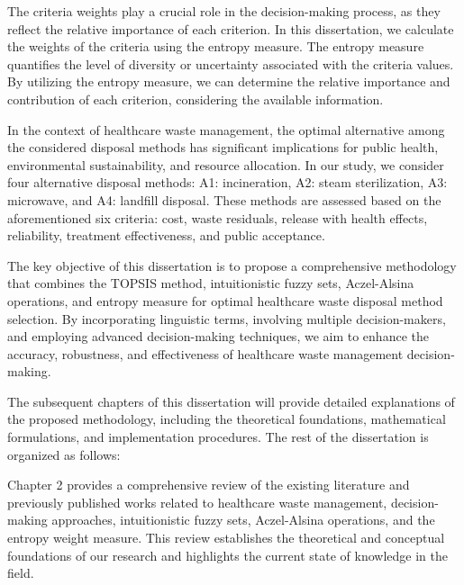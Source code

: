 \vspace{5mm}

The criteria weights play a crucial role in the decision-making process, as they reflect the relative importance of each criterion. In this dissertation, we calculate the weights of the criteria using the entropy measure. The entropy measure quantifies the level of diversity or uncertainty associated with the criteria values. By utilizing the entropy measure, we can determine the relative importance and contribution of each criterion, considering the available information.

\vspace{5mm}

In the context of healthcare waste management, the optimal alternative among the considered disposal methods has significant implications for public health, environmental sustainability, and resource allocation. In our study, we consider four alternative disposal methods: A1: incineration, A2: steam sterilization, A3: microwave, and A4: landfill disposal. These methods are assessed based on the aforementioned six criteria: cost, waste residuals, release with health effects, reliability, treatment effectiveness, and public acceptance.

\vspace{5mm}

The key objective of this dissertation is to propose a comprehensive methodology that combines the TOPSIS method, intuitionistic fuzzy sets, Aczel-Alsina operations, and entropy measure for optimal healthcare waste disposal method selection. By incorporating linguistic terms, involving multiple decision-makers, and employing advanced decision-making techniques, we aim to enhance the accuracy, robustness, and effectiveness of healthcare waste management decision-making.

\vspace{5mm}

The subsequent chapters of this dissertation will provide detailed explanations of the proposed methodology, including the theoretical foundations, mathematical formulations, and implementation procedures. The rest of the dissertation is organized as follows:

\vspace{5mm}

Chapter 2 provides a comprehensive review of the existing literature and previously published works related to healthcare waste management, decision-making approaches, intuitionistic fuzzy sets, Aczel-Alsina operations, and the entropy weight measure. This review establishes the theoretical and conceptual foundations of our research and highlights the current state of knowledge in the field.

